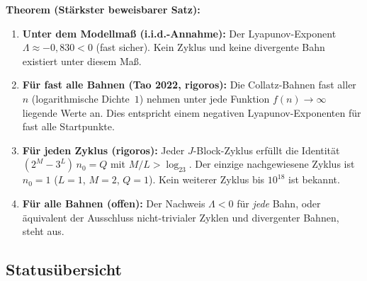 \documentclass[12pt,a4paper]{article}
\newcommand{\logt}{\log_2}        %
\begin{document}
\begin{tcolorbox}[hauptsatz]
\textbf{Theorem (Stärkster beweisbarer Satz):}

\medskip
\begin{enumerate}[label=\upshape(\arabic*), leftmargin=*]
  \item \textbf{Unter dem Modellmaß (i.i.d.-Annahme):}
    Der Lyapunov-Exponent $\Lambda \approx -0{,}830 < 0$ (fast sicher).
    Kein Zyklus und keine divergente Bahn existiert unter diesem Maß.

  \item \textbf{Für fast alle Bahnen (Tao 2022, rigoros):}
    Die Collatz-Bahnen fast aller~$n$ (logarithmische Dichte~$1$) nehmen
    unter jede Funktion $f(n)\to\infty$ liegende Werte an. Dies entspricht
    einem negativen Lyapunov-Exponenten für fast alle Startpunkte.

  \item \textbf{Für jeden Zyklus (rigoros):}
    Jeder $J$-Block-Zyklus erfüllt die Identität $(2^M - 3^L)\,n_0 = Q$
    mit $M/L > \logt 3$. Der einzige nachgewiesene Zyklus ist $n_0 = 1$
    ($L=1$, $M=2$, $Q=1$). Kein weiterer Zyklus bis $10^{18}$ ist bekannt.

  \item \textbf{Für alle Bahnen (offen):}
    Der Nachweis $\Lambda < 0$ für \emph{jede} Bahn, oder äquivalent
    der Ausschluss nicht-trivialer Zyklen und divergenter Bahnen,
    steht aus.
\end{enumerate}
\end{tcolorbox}

\subsection{Statusübersicht}
\end{document}

